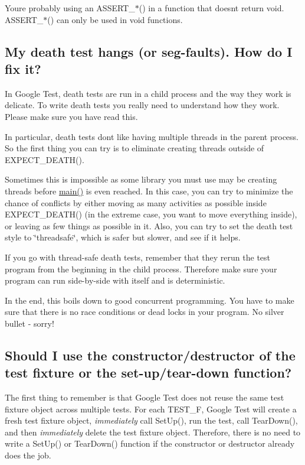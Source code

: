 You\textquotesingle{}re probably using an {\ttfamily A\+S\+S\+E\+R\+T\+\_\+$\ast$()} in a function that doesn\textquotesingle{}t return {\ttfamily void}. {\ttfamily A\+S\+S\+E\+R\+T\+\_\+$\ast$()} can only be used in {\ttfamily void} functions.

\subsection*{My death test hangs (or seg-\/faults). How do I fix it?}

In Google Test, death tests are run in a child process and the way they work is delicate. To write death tests you really need to understand how they work. Please make sure you have read this.

In particular, death tests don\textquotesingle{}t like having multiple threads in the parent process. So the first thing you can try is to eliminate creating threads outside of {\ttfamily E\+X\+P\+E\+C\+T\+\_\+\+D\+E\+A\+T\+H()}.

Sometimes this is impossible as some library you must use may be creating threads before {\ttfamily \hyperlink{app_2main_8cpp_ae66f6b31b5ad750f1fe042a706a4e3d4}{main()}} is even reached. In this case, you can try to minimize the chance of conflicts by either moving as many activities as possible inside {\ttfamily E\+X\+P\+E\+C\+T\+\_\+\+D\+E\+A\+T\+H()} (in the extreme case, you want to move everything inside), or leaving as few things as possible in it. Also, you can try to set the death test style to {\ttfamily \char`\"{}threadsafe\char`\"{}}, which is safer but slower, and see if it helps.

If you go with thread-\/safe death tests, remember that they rerun the test program from the beginning in the child process. Therefore make sure your program can run side-\/by-\/side with itself and is deterministic.

In the end, this boils down to good concurrent programming. You have to make sure that there is no race conditions or dead locks in your program. No silver bullet -\/ sorry!

\subsection*{Should I use the constructor/destructor of the test fixture or the set-\/up/tear-\/down function?}

The first thing to remember is that Google Test does not reuse the same test fixture object across multiple tests. For each {\ttfamily T\+E\+S\+T\+\_\+F}, Google Test will create a fresh test fixture object, {\itshape immediately} call {\ttfamily Set\+Up()}, run the test, call {\ttfamily Tear\+Down()}, and then {\itshape immediately} delete the test fixture object. Therefore, there is no need to write a {\ttfamily Set\+Up()} or {\ttfamily Tear\+Down()} function if the constructor or destructor already does the job.

